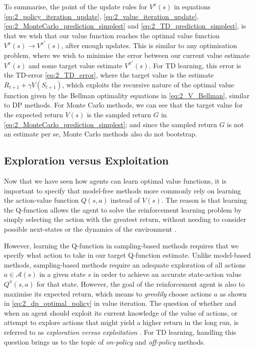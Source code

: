 To summarise, the point of the update rules for $V^{\pi}(s)$ in equations \eqref{eq:2_policy_iteration_update}, \eqref{eq:2_value_iteration_update}, \eqref{eq:2_MonteCarlo_prediction_simplest} and \eqref{eq:2_TD_prediction_simplest}, is that we wish that our value function reaches the optimal value function $V^{\pi}(s) \rightarrow V^{\pi^*}(s)$, after enough updates. This is similar to any optimisation problem, where we wish to minimise the error between our current value estimate $V^{\pi}(s)$ and some target value estimate $V^{\pi^*}(s)$. For TD learning, this error is the TD-error \eqref{eq:2_TD_error}, where the target value is the estimate $R_{t+1} + \gamma V(S_{t+1})$, which exploits the recursive nature of the optimal value function given by the Bellman optimality equations in \eqref{eq:2_V_Bellman}, similar to DP methods. For Monte Carlo methods, we can see that the target value for the expected return $V(s)$ is the sampled return $G$ in \eqref{eq:2_MonteCarlo_prediction_simplest}; and since the sampled return $G$ is not an estimate per se, Monte Carlo methods also do not bootstrap.


\subsection{Exploration versus Exploitation}
\label{subsec:2_exploration_vs_exploitation}
Now that we have seen how agents can learn optimal value functions, it is important to specify that model-free methods more commonly rely on learning the action-value function $Q(s, a)$ instead of $V(s)$. The reason is that learning the Q-function allows the agent to solve the reinforcement learning problem by simply selecting the action with the greatest return, without needing to consider possible next-states or the dynamics of the environment \cite{suttonAndBartoBook}.

However, learning the Q-function in sampling-based methods requires that we specify what action to take in our target Q-function estimate.
Unlike model-based methods, sampling-based methods require an adequate exploration of all actions $a \in \mathcal{A}(s)$ in a given state $s$ in order to achieve an accurate state-action value $Q^{\pi}(s, a)$ for that state. However, the goal of the reinforcement agent is also to maximise its expected return, which means to \textit{greedily} choose actions $a$ as shown in \eqref{eq:2_dp_optimal_policy} in value iteration. The question of whether and when an agent should exploit its current knowledge of the value of actions, or attempt to explore actions that might yield a higher return in the long run, is referred to as \textit{exploration versus exploitation} \cite{suttonAndBartoBook}.
For TD learning, handling this question brings us to the topic of \textit{on-policy} and \textit{off-policy} methods.



